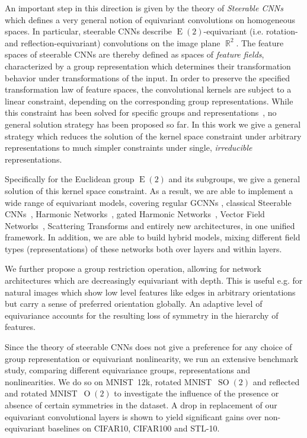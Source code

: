 \documentclass{article}
\DeclareMathOperator*{\R}{\mathbb{R}}
\newcommand{\E}[1]{\ensuremath{\operatorname{E}(#1)}}
\renewcommand{\O}[1]{\ensuremath{\operatorname{O}(#1)}}
\newcommand{\SO}[1]{\ensuremath{\operatorname{SO}(#1)}}
\begin{document}
An important step in this direction is given by the theory of \emph{Steerable CNNs}~\cite{Cohen2017-STEER,3d_steerableCNNs,Cohen2018-IIR,generaltheory,gauge} which defines a very general notion of equivariant convolutions on homogeneous spaces.
In particular, steerable CNNs describe $\E2$-equivariant (i.e. rotation- and reflection-equivariant) convolutions on the image plane $\R^2$.
The feature spaces of steerable CNNs are thereby defined as spaces of \emph{feature fields}, characterized by a group representation which determines their transformation behavior under transformations of the input.
In order to preserve the specified transformation law of feature spaces, the convolutional kernels are subject to a linear constraint, depending on the corresponding group representations.
While this constraint has been solved for specific groups and representations~\cite{Cohen2017-STEER,3d_steerableCNNs}, no general solution strategy has been proposed so far.
In this work we give a general strategy which reduces the solution of the kernel space constraint under arbitrary representations to much simpler constraints under single, \emph{irreducible} representations.

Specifically for the Euclidean group $\E2$ and its subgroups, we give a general solution of this kernel space constraint.
As a result, we are able to implement a wide range of equivariant models, covering regular GCNNs
\cite{Cohen2016-GCNN,Weiler2018-STEERABLE,Hoogeboom2018-HEX,bekkers2018roto,Dieleman2016-CYC,Kondor2018-GENERAL},
classical Steerable CNNs~\cite{Cohen2017-STEER}, Harmonic Networks~\cite{Worrall2017-HNET}, gated Harmonic Networks~\cite{3d_steerableCNNs}, Vector Field Networks~\cite{Marcos2017-VFN},
Scattering Transforms \cite{sifre2012combined,Sifre2013-GSCAT,bruna2013invariant,sifre2014rigid,oyallonDeepRotoTranslationScattering2015}
and entirely new architectures, in one unified framework.
In addition, we are able to build hybrid models, mixing different field types (representations) of these networks both over layers and within layers.


We further propose a group restriction operation, allowing for network architectures which are decreasingly equivariant with depth.
This is useful e.g. for natural images which show low level features like edges in arbitrary orientations but carry a sense of preferred orientation globally.
An adaptive level of equivariance accounts for the resulting loss of symmetry in the hierarchy of features.

Since the theory of steerable CNNs does not give a preference for any choice of group representation or equivariant nonlinearity, we run an extensive benchmark study, comparing different equivariance groups, representations and nonlinearities.
We do so on MNIST~12k, rotated MNIST~$\SO2$ and reflected and rotated MNIST~$\O2$ to investigate the influence of the presence or absence of certain symmetries in the dataset.
A drop in replacement of our equivariant convolutional layers is shown to yield significant gains over non-equivariant baselines on CIFAR10, CIFAR100 and STL-10.
\end{document}

